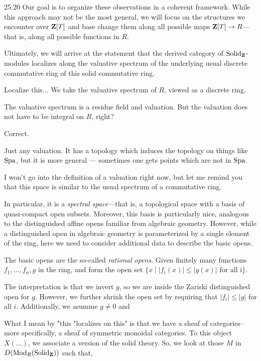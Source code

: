 \begin{unfinished}{25:20}
Our goal is to organize these observations in a coherent framework.
While this approach may not be the most general, we will focus on the structures we encounter over $\mathbf Z[T]$ and base change them along all possible maps $\mathbf Z[T] \to R$---that is, along all possible functions in $R$.

Ultimately, we will arrive at the statement that the derived category of $\mathrm{Solid}_\mathbf Z$-modules localizes along the valuative spectrum of the underlying usual discrete commutative ring of this solid commutative ring. 

\ques Localize this... We take the valuative spectrum of $R$, viewed as a discrete ring.

\ques The valuative spectrum is a residue field and valuation. But the valuation does not have to be integral on $R$, right?

\ans Correct.

\ques Just any valuation. It has a topology which induces the topology on things like $\operatorname{Spa}$, but it is more general --- sometimes one gets points which are not in $\operatorname{Spa}$. 

I won't go into the definition of a valuation right now, but let me remind you that this space is similar to the usual spectrum of a commutative ring. 

In particular, it is a \emph{spectral space}---that is, a topological space with a basis of quasi-compact open subsets. Moreover, this basis is particularly nice, analogous to the distinguished affine opens familiar from algebraic geometry.
However, while a distinguished open in algebraic geometry is parameterized by a single element of the ring, here we need to consider additional data to describe the basic opens.

%
The basic opens are the so-called \emph{rational opens}. Given finitely many functions $f_1, \ldots,f_n, g$ in the ring, and form the open set $\{x \mid |f_i(x)| \le |g(x)|\text { for all i}\}$. %

The interpretation is that we invert $g$, so we are inside the Zariski distinguished open for $g$. However, we further shrink the open set by requiring that $|f_i| \le |g|$ for all $i$. Additionally, we asumme $g \neq 0$ and %

What I mean by "this "localizes on this" is that we have a sheaf of categories--more specifically, a sheaf of symmetric monoidal categories. 
To this object $X(...)$, we associate a version of the solid theory. 
So, we look at those $M$ in $D(\operatorname{Mod}_R(\mathrm{Solid}_{\mathbf Z}))$ such that, 


\end{unfinished}
